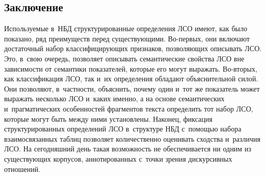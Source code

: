 \begin{multicols}{2}
\vspace*{-9pt}

\section{Заключение}

\vspace*{-3pt}

   Используемые в~НБД структурированные определения ЛСО имеют, как 
было показано, ряд преимуществ перед существующими. Во-пер\-вых, они 
включают достаточный набор классифицирующих признаков, позволяющих 
описывать ЛСО. Это, в~свою очередь, позволяет описывать семантические 
свойства ЛСО вне зависимости от семантики показателей, которые его могут 
выражать. Во-вто\-рых, как классификация ЛСО, так и~их определения 
обладают объяснительной силой. Они позволяют, в~част\-ности, объяснить, 
почему один и~тот же показатель может выражать несколько ЛСО и~каких 
именно, а на основе семантических и~прагматических особенностей 
фрагментов текста определить тот набор ЛСО, которые могут быть между 
ними установлены. Наконец, фиксация структурированных определений ЛСО 
в~структуре НБД с~помощью набора взаимосвязанных таблиц позволяет 
количественно оценивать сходства и~различия ЛСО. На сегодняшний день 
такая возможность не обеспечивается ни одним из существующих корпусов, 
аннотированных с~точки зрения дискурсивных отношений. 
   
{\small\frenchspacing
 {%
 \begin{thebibliography}{99}


\end{thebibliography}}}
\end{multicols}
